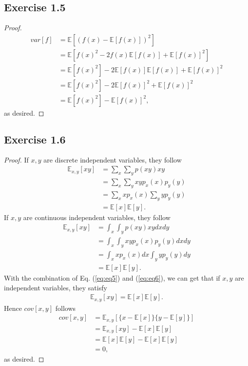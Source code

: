\documentclass[11pt]{article}
\theoremstyle{definition}
\newcommand{\E}{\mathbb{E}}
\begin{document}
\subsection{Exercise 1.5}
\begin{proof}
\begin{align*}
var[f] &= \mathbb{E}\left[(f(x)-\mathbb{E}[f(x)])^2\right] \\
&= \mathbb{E}\left[f(x)^2 - 2f(x)\mathbb{E}[f(x)] + \mathbb{E}[f(x)]^2\right] \\
&= \mathbb{E}[f(x)^2] - 2\mathbb{E}[f(x)]\E[f(x)] + \mathbb{E}[f(x)]^2 \\
&= \mathbb{E}[f(x)^2] - 2\mathbb{E}[f(x)]^2 + \mathbb{E}[f(x)]^2\\
&= \mathbb{E}[f(x)^2] - \mathbb{E}[f(x)]^2,
\end{align*} 
as desired.
\end{proof}

\subsection{Exercise 1.6}
\begin{proof}
If $x, y$ are discrete independent variables, they follow
\begin{align}
\mathbb{E}_{x,y}[xy] &= \sum_{x}\sum_{y}p(xy)xy \nonumber\\
&= \sum_{x}\sum_{y}xyp_x(x)p_y(y) \nonumber\\
&= \sum_{x}xp_x(x)\sum_{y}yp_y(y) \nonumber\\
&= \mathbb{E}[x]\mathbb{E}[y]. \label{eq:eq5}
\end{align}
If $x, y$ are continuous independent variables, they follow
\begin{align}
\mathbb{E}_{x,y}[xy] &= \int_{x}\int_{y}p(xy)xydxdy \nonumber\\
&= \int_{x}\int_{y}xyp_x(x)p_y(y)dxdy \nonumber\\
&= \int_{x}xp_x(x)dx\int_{y}yp_y(y)dy \nonumber\\
&= \mathbb{E}[x]\mathbb{E}[y]. \label{eq:eq6}
\end{align}
With the combination of Eq. (\ref{eq:eq5}) and (\ref{eq:eq6}), we can get that if $x, y$ are independent variables, they satisfy
\begin{align}
\mathbb{E}_{x,y}[xy] = \mathbb{E}[x]\mathbb{E}[y]. \nonumber
\end{align}
Hence $cov[x, y]$ follows
\begin{equation*}
\begin{aligned}
cov[x, y] &= \mathbb{E}_{x,y}\left[\{x-\mathbb{E}[x]\}\{y-\mathbb{E}[y]\}\right] \\
&= \mathbb{E}_{x,y}[xy] - \mathbb{E}[x]\mathbb{E}[y] \\
&= \mathbb{E}[x]\mathbb{E}[y] - \mathbb{E}[x]\mathbb{E}[y] \\
&= 0,
\end{aligned}
\end{equation*}
as desired.
\end{proof}
\end{document}
